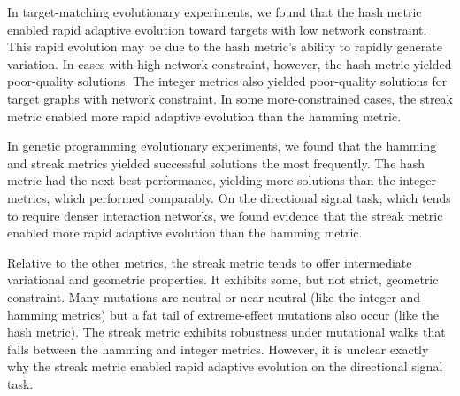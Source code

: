 In target-matching evolutionary experiments, we found that the hash metric enabled rapid adaptive evolution toward targets with low network constraint.
This rapid evolution may be due to the hash metric's ability to rapidly generate variation.
In cases with high network constraint, however, the hash metric yielded poor-quality solutions.
The integer metrics also yielded poor-quality solutions for target graphs with network constraint.
In some more-constrained cases, the streak metric enabled more rapid adaptive evolution than the hamming metric.

In genetic programming evolutionary experiments, we found that the hamming and streak metrics yielded successful solutions the most frequently.
The hash metric had the next best performance, yielding more solutions than the integer metrics, which performed comparably.
On the directional signal task, which tends to require denser interaction networks, we found evidence that the streak metric enabled more rapid adaptive evolution than the hamming metric.

Relative to the other metrics, the streak metric tends to offer intermediate variational and geometric properties.
It exhibits some, but not strict, geometric constraint.
Many mutations are neutral or near-neutral (like the integer and hamming metrics) but a fat tail of extreme-effect mutations also occur (like the hash metric).
The streak metric exhibits robustness under mutational walks that falls between the hamming and integer metrics. 
However, it is unclear exactly why the streak metric enabled rapid adaptive evolution on the directional signal task.



